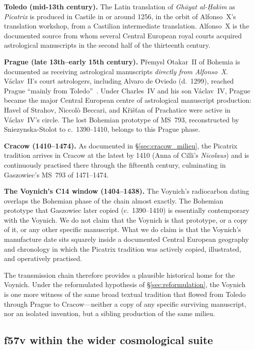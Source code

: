 \noindent\textbf{Toledo (mid-13th century).} The Latin translation of
\textit{Gh\=ayat al-\d{H}ak\={\i}m} as \textit{Picatrix} is produced in
Castile in or around 1256, in the orbit of Alfonso~X's translation
workshop, from a Castilian intermediate translation. Alfonso~X is the
documented source from whom several Central European royal courts
acquired astrological manuscripts in the second half of the
thirteenth century.

\noindent\textbf{Prague (late 13th--early 15th century).} \v{P}\v{r}emysl
Otakar~II of Bohemia is documented as receiving astrological
manuscripts \emph{directly from Alfonso~X}. V\'aclav~II's court
astrologers, including Alvaro de Oviedo (d.~1299), reached Prague
``mainly from Toledo''~\citep[p.~12]{sniezynska2009}. Under Charles~IV
and his son V\'aclav~IV, Prague became the major Central European
centre of astrological manuscript production: Havel of Strahov,
Niccol\`o Beccari, and K\v{r}i\v{s}\v{t}an of Prachatice were active
in V\'aclav~IV's circle. The lost Bohemian prototype of MS~793,
reconstructed by Sniezynska-Stolot to c.~1390--1410, belongs to this
Prague phase.

\noindent\textbf{Cracow (1410--1474).} As documented in
\S\ref{sec:cracow_milieu}, the Picatrix tradition arrives in Cracow at
the latest by 1410 (Anna of Cilli's \textit{Nicolaus}) and is
continuously practised there through the fifteenth century, culminating
in Gaszowiec's MS~793 of 1471--1474.

\noindent\textbf{The Voynich's C14 window (1404--1438).} The Voynich's
radiocarbon dating overlaps the Bohemian phase of the chain almost
exactly. The Bohemian prototype that Gaszowiec later copied
(c.~1390--1410) is essentially contemporary with the Voynich. We do
not claim that the Voynich is that prototype, or a copy of it, or any
other specific manuscript. What we do claim is that the Voynich's
manufacture date sits squarely inside a documented Central European
geography and chronology in which the Picatrix tradition was actively
copied, illustrated, and operatively practised.

The transmission chain therefore provides a plausible historical home
for the Voynich. Under the reformulated hypothesis of
\S\ref{sec:reformulation}, the Voynich is one more witness of the same
broad textual tradition that flowed from Toledo through Prague to
Cracow---neither a copy of any specific surviving manuscript, nor an
isolated invention, but a sibling production of the same milieu.

\subsection{f57v within the wider cosmological suite}
\label{sec:cosmological_program}

